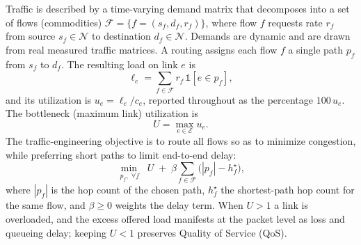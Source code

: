 Traffic is described by a time-varying demand matrix that decomposes into a set
of flows (commodities)
$\mathcal{F}=\{f=(s_f,d_f,r_f)\}$, where flow $f$ requests rate $r_f$ from
source $s_f\in\mathcal{N}$ to destination $d_f\in\mathcal{N}$. Demands are
dynamic and are drawn from real measured traffic matrices. A routing assigns
each flow $f$ a single path $p_f$ from $s_f$ to $d_f$. The resulting load on
link $e$ is
\begin{equation}\label{eq:load}
\ell_e=\sum_{f\in\mathcal{F}} r_f\,\mathbb{1}\!\left[e\in p_f\right],
\end{equation}
and its utilization is $u_e=\ell_e/c_e$, reported throughout as the percentage
$100\,u_e$. The bottleneck (maximum link) utilization is
\begin{equation}\label{eq:bottleneck}
U=\max_{e\in\mathcal{E}} u_e .
\end{equation}
The traffic-engineering objective is to route all flows so as to minimize
congestion, while preferring short paths to limit end-to-end delay:
\begin{equation}\label{eq:objective}
\min_{\,p_f,\;\forall f}\;\; U \;+\; \beta \sum_{f\in\mathcal{F}}
\bigl(|p_f|-h^{\star}_f\bigr),
\end{equation}
where $|p_f|$ is the hop count of the chosen path, $h^{\star}_f$ the
shortest-path hop count for the same flow, and $\beta\ge0$ weights the delay
term. When $U>1$ a link is overloaded, and the excess offered load manifests at
the packet level as loss and queueing delay; keeping $U<1$ preserves Quality of
Service (QoS).


